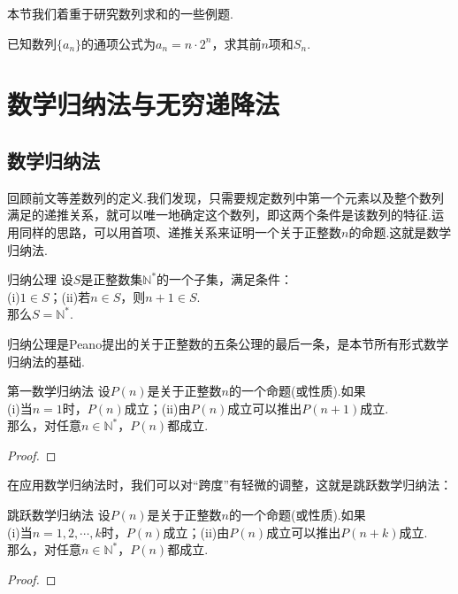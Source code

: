 \documentclass[lang=cn, zihao=5]{elegantbook}
\begin{document}
本节我们着重于研究数列求和的一些例题.

\begin{example}
	已知数列$\{ a_n \}$的通项公式为$a_n=n \cdot 2^n$，求其前$n$项和$S_n$.
\end{example}

\section{数学归纳法与无穷递降法}

\subsection{数学归纳法}

回顾前文等差数列的定义.我们发现，只需要规定数列中第一个元素以及整个数列满足的递推关系，就可以唯一地确定这个数列，即这两个条件是该数列的特征.运用同样的思路，可以用首项、递推关系来证明一个关于正整数$n$的命题.这就是数学归纳法.

\begin{axiom}{归纳公理}
	设$S$是正整数集$\mathbb{N}^{*}$的一个子集，满足条件： \\
	(i)$1 \in S$；(ii)若$n \in S$，则$n+1 \in S$. \\
	那么$S = \mathbb{N}^{*}$.
\end{axiom}
\begin{remark}
	归纳公理是Peano提出的关于正整数的五条公理的最后一条，是本节所有形式数学归纳法的基础.
\end{remark}

\begin{theorem}{第一数学归纳法}
	设$P(n)$是关于正整数$n$的一个命题(或性质).如果 \\
	(i)当$n=1$时，$P(n)$成立；(ii)由$P(n)$成立可以推出$P(n+1)$成立. \\
	那么，对任意$n \in \mathbb{N}^{*}$，$P(n)$都成立.
\end{theorem}
\begin{proof}
\end{proof}

在应用数学归纳法时，我们可以对“跨度”有轻微的调整，这就是跳跃数学归纳法：

\begin{corollary}{跳跃数学归纳法}
	设$P(n)$是关于正整数$n$的一个命题(或性质).如果 \\
	(i)当$n=1,2, \cdots ,k$时，$P(n)$成立；(ii)由$P(n)$成立可以推出$P(n+k)$成立. \\
	那么，对任意$n \in \mathbb{N}^{*}$，$P(n)$都成立.
\end{corollary}
\begin{proof}
\end{proof}
\end{document}
